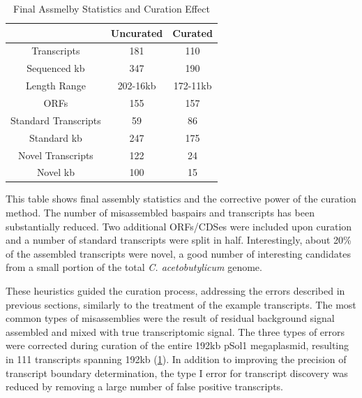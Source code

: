 \begin{table}
\begin{center}
\begin{tabular}{|c|c|c|}\hline
  & Uncurated & Curated\\\hline\hline
Transcripts & 181 & 110\\\hline
Sequenced kb & 347 & 190\\\hline
Length Range & 202-16kb & 172-11kb\\\hline
ORFs & 155 & 157\\\hline
Standard Transcripts & 59 & 86\\\hline
Standard kb & 247 & 175\\\hline
Novel Transcripts & 122 & 24\\\hline
Novel kb & 100 & 15\\\hline
\end{tabular}
\end{center}
\caption{Final Assmelby Statistics and Curation Effect}\label{table:assemb_curation}
This table shows final assembly statistics and the corrective power of the curation method. The number of misassembled baspairs and transcripts has been substantially reduced. Two additional ORFs/CDSes were included upon curation and a number of standard transcripts were split in half. Interestingly, about 20\% of the assembled transcripts were novel, a good number of interesting candidates from a small portion of the total \textit{C. acetobutylicum} genome.
\end{table}



These heuristics guided the curation process, addressing the errors described in previous sections, similarly to the treatment of the example transcripts. The most common types of misassemblies were the result of residual background signal assembled and mixed with true transcriptomic signal. The three types of errors were corrected during curation of the entire 192kb pSol1 megaplasmid, resulting in 111 transcripts spanning 192kb (\ref{table:assemb_curation}). In addition to improving the precision of transcript boundary determination, the type I error for transcript discovery was reduced by removing a large number of false positive transcripts.

